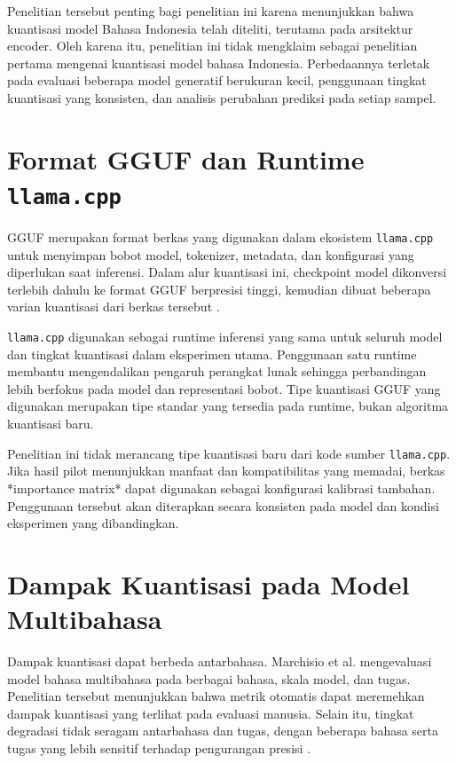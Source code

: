Penelitian tersebut penting bagi penelitian ini karena menunjukkan bahwa kuantisasi model Bahasa Indonesia telah diteliti, terutama pada arsitektur encoder. Oleh karena itu, penelitian ini tidak mengklaim sebagai penelitian pertama mengenai kuantisasi model bahasa Indonesia. Perbedaannya terletak pada evaluasi beberapa model generatif berukuran kecil, penggunaan tingkat kuantisasi yang konsisten, dan analisis perubahan prediksi pada setiap sampel.

\section{Format GGUF dan Runtime \texttt{llama.cpp}}

GGUF merupakan format berkas yang digunakan dalam ekosistem \texttt{llama.cpp} untuk menyimpan bobot model, tokenizer, metadata, dan konfigurasi yang diperlukan saat inferensi. Dalam alur kuantisasi ini, checkpoint model dikonversi terlebih dahulu ke format GGUF berpresisi tinggi, kemudian dibuat beberapa varian kuantisasi dari berkas tersebut \citep{llamacpp2026}.

\texttt{llama.cpp} digunakan sebagai runtime inferensi yang sama untuk seluruh model dan tingkat kuantisasi dalam eksperimen utama. Penggunaan satu runtime membantu mengendalikan pengaruh perangkat lunak sehingga perbandingan lebih berfokus pada model dan representasi bobot. Tipe kuantisasi GGUF yang digunakan merupakan tipe standar yang tersedia pada runtime, bukan algoritma kuantisasi baru.

Penelitian ini tidak merancang tipe kuantisasi baru dari kode sumber \texttt{llama.cpp}. Jika hasil pilot menunjukkan manfaat dan kompatibilitas yang memadai, berkas *importance matrix* dapat digunakan sebagai konfigurasi kalibrasi tambahan. Penggunaan tersebut akan diterapkan secara konsisten pada model dan kondisi eksperimen yang dibandingkan.

\section{Dampak Kuantisasi pada Model Multibahasa}

Dampak kuantisasi dapat berbeda antarbahasa. Marchisio et al. mengevaluasi model bahasa multibahasa pada berbagai bahasa, skala model, dan tugas. Penelitian tersebut menunjukkan bahwa metrik otomatis dapat meremehkan dampak kuantisasi yang terlihat pada evaluasi manusia. Selain itu, tingkat degradasi tidak seragam antarbahasa dan tugas, dengan beberapa bahasa serta tugas yang lebih sensitif terhadap pengurangan presisi \citep{marchisio2024multilingual}.

